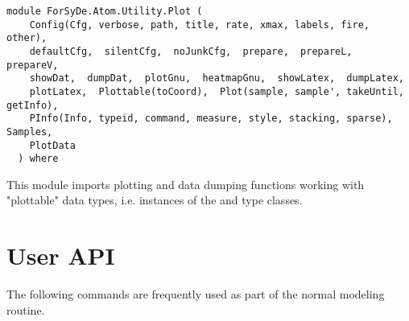 \label{module:ForSyDe.Atom.Utility.Plot}
\haddockbeginheader
{\haddockverb\begin{verbatim}
module ForSyDe.Atom.Utility.Plot (
    Config(Cfg, verbose, path, title, rate, xmax, labels, fire, other), 
    defaultCfg,  silentCfg,  noJunkCfg,  prepare,  prepareL,  prepareV, 
    showDat,  dumpDat,  plotGnu,  heatmapGnu,  showLatex,  dumpLatex, 
    plotLatex,  Plottable(toCoord),  Plot(sample, sample', takeUntil, getInfo), 
    PInfo(Info, typeid, command, measure, style, stacking, sparse),  Samples, 
    PlotData
  ) where\end{verbatim}}
\haddockendheader

This module imports plotting and data dumping functions working
 with "plottable" data types, i.e. instances of the  and
  type classes.\par

\section{User API}
The following commands are frequently used as part of the
 normal modeling routine.\par

